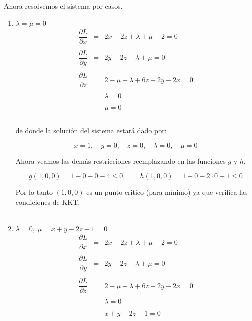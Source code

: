 \begin{enumerate}
\begin{enumerate}[\bfseries a)]
		Ahora resolvemos el sistema por casos.\\

		\begin{enumerate}[1.]

		    \item $\lambda = \mu = 0$\\
			$$\begin{array}{rcl}
			    \dfrac{\partial L}{\partial x}&=&2x-2z+\lambda + \mu -2 = 0\\\\
			    \dfrac{\partial L}{\partial y}&=&2y-2z+\lambda + \mu = 0\\\\
			    \dfrac{\partial L}{\partial z}&=&2-\mu + \lambda +6z-2y-2x=0\\\\
							  &&\lambda= 0\\\\
							  &&\mu = 0\\\\
			\end{array}$$


			de donde la solución del sistema estará dado por:

			$$x=1,\quad y=0,\quad z=0,\quad \lambda=0,\quad \mu=0$$
		    
			Ahora veamos las demás restricciones reemplazando en las funciones $g$ y $h$. 

			$$g(1,0,0)=1-0-0-4\leq 0, \qquad h(1,0,0)=1+0-2\cdot 0 - 1 \leq 0$$
			
			Por lo tanto $(1,0,0)$ es un punto critico (para mínimo) ya que  verifica las condiciones de KKT. \\\\


		    \item $\lambda = 0,\; \mu = x+y-2z-1=0$\\

			$$\begin{array}{rcl}
			    \dfrac{\partial L}{\partial x}&=&2x-2z+\lambda + \mu -2 = 0\\\\
			    \dfrac{\partial L}{\partial y}&=&2y-2z+\lambda + \mu = 0\\\\
			    \dfrac{\partial L}{\partial z}&=&2-\mu + \lambda +6z-2y-2x=0\\\\
							  &&\lambda= 0\\\\
							  &&x+y-2z-1 = 0\\\\
			\end{array}$$


\end{enumerate}
\end{enumerate}
\end{enumerate}
